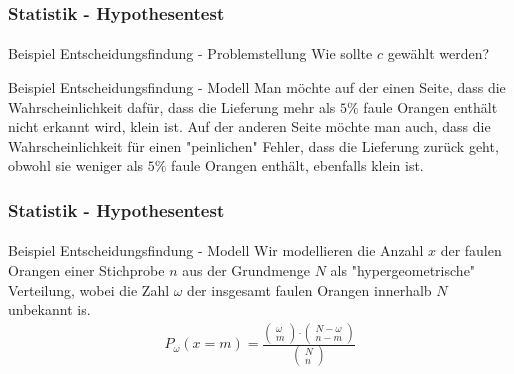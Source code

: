 \documentclass{beamer}
\begin{document}
\begin{frame}
    \frametitle{Statistik - Hypothesentest}
\framesubtitle{}
\begin{block}{Beispiel Entscheidungsfindung - Problemstellung}
Wie sollte $c$ gewählt werden?
\end{block}


\begin{block}{Beispiel Entscheidungsfindung - Modell}
Man möchte auf der einen Seite, dass die Wahrscheinlichkeit dafür, dass die Lieferung mehr als $5 \%$ faule Orangen enthält nicht erkannt wird, klein ist.
Auf der anderen Seite möchte man auch, dass die Wahrscheinlichkeit für einen  "peinlichen" Fehler, dass die Lieferung zurück geht, obwohl sie weniger als  $5 \%$ faule Orangen enthält, ebenfalls klein ist. 
\end{block}


 \end{frame}


\begin{frame}
    \frametitle{Statistik - Hypothesentest}
\framesubtitle{}
\begin{block}{Beispiel Entscheidungsfindung - Modell}
Wir modellieren die Anzahl $x$ der faulen Orangen einer Stichprobe $n$ aus der Grundmenge $N$ als "hypergeometrische" Verteilung, wobei die Zahl  $\omega$ der insgesamt faulen  Orangen innerhalb $N$ unbekannt is.
\begin{align*}
P_\omega (x = m)= \frac{\begin{pmatrix} \omega \\ m \end{pmatrix} \cdot  \begin{pmatrix} N - \omega \\ n - m \end{pmatrix}}{\begin{pmatrix} N \\ n \end{pmatrix} }
\end{align*} 
\end{block}


 \end{frame}
\end{document}
